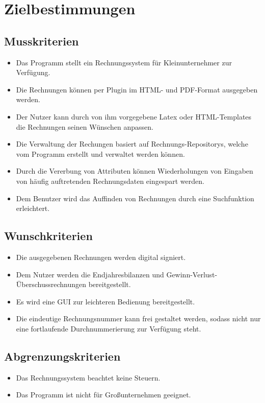 
\section{Zielbestimmungen}



\subsection{Musskriterien}

\begin{itemize}
	\item Das Programm stellt ein Rechnungssystem für Kleinunternehmer zur Verfügung.
	\item Die Rechnungen können per Plugin im HTML- und PDF-Format ausgegeben werden.
	\item Der Nutzer kann durch von ihm vorgegebene Latex oder HTML-Templates die Rechnungen seinen Wünschen anpassen.
	\item Die Verwaltung der Rechungen basiert auf Rechnungs-Repositorys, welche vom Programm erstellt und verwaltet werden können.
	\item Durch die Vererbung von Attributen können Wiederholungen von Eingaben von häufig auftretenden Rechnungsdaten eingespart werden.
	\item Dem Benutzer wird das Auffinden von Rechnungen durch eine Suchfunktion erleichtert.
	
\end{itemize}

\subsection{Wunschkriterien}

\begin{itemize}
	\item Die ausgegebenen Rechnungen werden digital signiert.
	\item Dem Nutzer werden die Endjahresbilanzen und Gewinn-Verlust-Überschussrechnungen bereitgestellt.
	\item Es wird eine GUI zur leichteren Bedienung bereitgestellt.
	\item Die eindeutige Rechnungsnummer kann frei gestaltet werden, sodass nicht nur eine fortlaufende Durchnummerierung zur Verfügung steht.
\end{itemize}

\subsection{Abgrenzungskriterien}

\begin{itemize}
	\item Das Rechnungssystem beachtet keine Steuern.
	\item Das Programm ist nicht für Großunternehmen geeignet.
\end{itemize}
